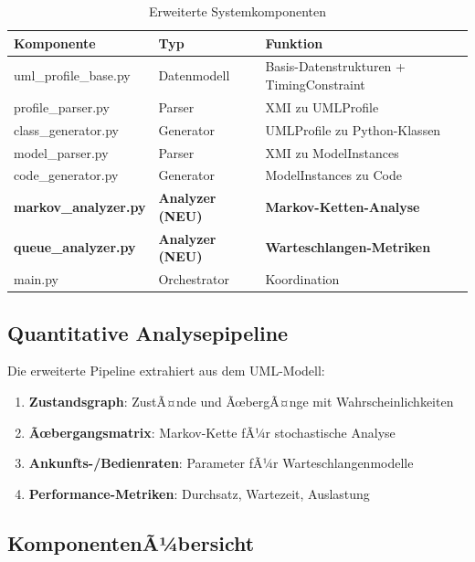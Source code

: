 ﻿\documentclass[a4paper,12pt]{scrreprt}
\theoremstyle{definition}
\begin{document}
\begin{table}[H]
	\centering
	\begin{tabular}{@{}llp{6cm}@{}}
		\toprule
		\textbf{Komponente} & \textbf{Typ} & \textbf{Funktion} \\
		\midrule
		uml\_profile\_base.py & Datenmodell & Basis-Datenstrukturen + TimingConstraint \\
		profile\_parser.py & Parser & XMI zu UMLProfile \\
		class\_generator.py & Generator & UMLProfile zu Python-Klassen \\
		model\_parser.py & Parser & XMI zu ModelInstances \\
		code\_generator.py & Generator & ModelInstances zu Code \\
		\textbf{markov\_analyzer.py} & \textbf{Analyzer (NEU)} & \textbf{Markov-Ketten-Analyse} \\
		\textbf{queue\_analyzer.py} & \textbf{Analyzer (NEU)} & \textbf{Warteschlangen-Metriken} \\
		main.py & Orchestrator & Koordination \\
		\bottomrule
	\end{tabular}
	\caption{Erweiterte Systemkomponenten}
	\label{tab:components-extended}
\end{table}

\subsection{Quantitative Analysepipeline}

Die erweiterte Pipeline extrahiert aus dem UML-Modell:

\begin{enumerate}
	\item[-] \textbf{Zustandsgraph}: ZustÃ¤nde und ÃœbergÃ¤nge mit Wahrscheinlichkeiten
	\item[-] \textbf{Ãœbergangsmatrix}: Markov-Kette fÃ¼r stochastische Analyse
	\item[-] \textbf{Ankunfts-/Bedienraten}: Parameter fÃ¼r Warteschlangenmodelle
	\item[-] \textbf{Performance-Metriken}: Durchsatz, Wartezeit, Auslastung
\end{enumerate}

\subsection{KomponentenÃ¼bersicht}
\end{document}
